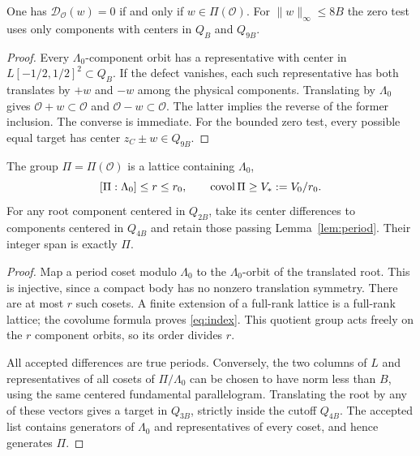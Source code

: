 \begin{lemma}\label{lem:period}
One has $\mathcal D_{\mathcal O}(w)=0$ if and only if
$w\in\Pi(\mathcal O)$. For $\|w\|_\infty\le8B$ the zero test uses
only components with centers in $Q_B$ and $Q_{9B}$.
\end{lemma}
\begin{proof}
Every $\Lambda_0$-component orbit has a representative with center in
$L[-1/2,1/2]^2\subset Q_B$. If the defect vanishes, each such
representative has both translates by $+w$ and $-w$ among the physical
components. Translating by $\Lambda_0$ gives
$\mathcal O+w\subset\mathcal O$ and $\mathcal O-w\subset\mathcal O$.
The latter implies the reverse of the former inclusion. The converse
is immediate. For the bounded zero test, every possible equal target
has center $z_C\pm w\in Q_{9B}$.
\end{proof}

\begin{lemma}\label{lem:generators}
The group $\Pi=\Pi(\mathcal O)$ is a lattice containing $\Lambda_0$,
\begin{equation}\label{eq:index}
 [\Pi:\Lambda_0]\le r\le r_0,\qquad \operatorname{covol}\Pi\ge V_*:=V_0/r_0.
\end{equation}
For any root component centered in $Q_{2B}$, take its center differences
to components centered in $Q_{4B}$ and retain those passing
Lemma~\ref{lem:period}. Their integer span is exactly $\Pi$.
\end{lemma}
\begin{proof}
Map a period coset modulo $\Lambda_0$ to the $\Lambda_0$-orbit of the
translated root. This is injective, since a compact body has no nonzero
translation symmetry. There are at most $r$ such cosets. A finite
extension of a full-rank lattice is a full-rank lattice; the covolume
formula proves \eqref{eq:index}. This quotient group acts freely on
the $r$ component orbits, so its order divides $r$.

All accepted differences are true periods. Conversely, the two columns
of $L$ and representatives of all cosets of $\Pi/\Lambda_0$ can be
chosen to have norm less than $B$, using the same centered fundamental
parallelogram. Translating the root by any of these vectors gives a
target in $Q_{3B}$, strictly inside the cutoff $Q_{4B}$. The accepted
list contains generators of $\Lambda_0$ and representatives of every
coset, and hence generates $\Pi$.
\end{proof}

